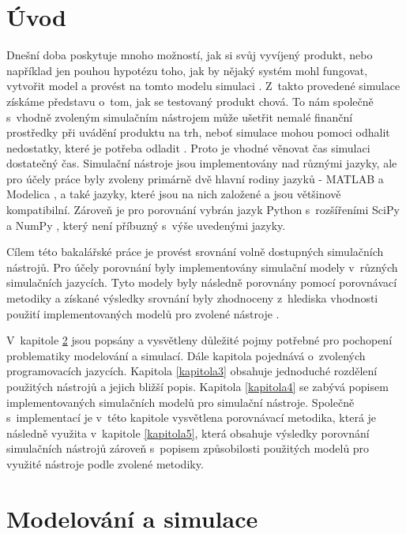 \chapter{Úvod}

Dnešní doba poskytuje mnoho možností, jak si svůj vyvíjený produkt, nebo například jen pouhou hypotézu toho, jak by nějaký systém mohl fungovat, vytvořit model a provést na tomto modelu simulaci \cite{NEGRAO20113051}. Z~takto provedené simulace získáme představu o~tom, jak se testovaný produkt chová. To nám společně s~vhodně zvoleným simulačním nástrojem může ušetřit nemalé finanční prostředky při uvádění produktu na trh, neboť simulace mohou pomoci odhalit nedostatky, které je potřeba odladit \cite{cohen2010cost}. Proto je vhodné věnovat čas simulaci dostatečný čas. Simulační nástroje jsou implementovány nad různými jazyky, ale pro účely práce byly zvoleny primárně dvě hlavní rodiny jazyků - MATLAB \cite{MATLAB:2010} a Modelica \cite{Fritzson02modelica--}, a také jazyky, které jsou na nich založené a jsou většinově kompatibilní. Zároveň je pro porovnání vybrán jazyk Python s~rozšířeními SciPy a NumPy \cite{scipy}, který není příbuzný s~výše uvedenými jazyky.

Cílem této bakalářské práce je provést srovnání volně dostupných simulačních nástrojů. Pro účely porovnání byly implementovány simulační modely v~různých simulačních jazycích. Tyto modely byly následně porovnány pomocí porovnávací metodiky a získané výsledky srovnání byly zhodnoceny z~hlediska vhodnosti použití implementovaných modelů pro zvolené nástroje \cite{jones2004traffic}.

V~kapitole \ref{kapitola2} jsou popsány a vysvětleny důležité pojmy potřebné pro pochopení problematiky modelování a simulací. Dále kapitola pojednává o~zvolených programovacích jazycích. Kapitola \ref{kapitola3} obsahuje jednoduché rozdělení použitých nástrojů a jejich bližší popis. Kapitola \ref{kapitola4} se zabývá popisem implementovaných simulačních modelů pro simulační nástroje. Společně s~implementací je v~této kapitole vysvětlena porovnávací metodika, která je následně využita v~kapitole \ref{kapitola5}, která obsahuje výsledky porovnání simulačních nástrojů zároveň s~popisem způsobilosti použitých modelů pro využité nástroje podle zvolené metodiky.

\chapter{Modelování a simulace}
\label{kapitola2}

